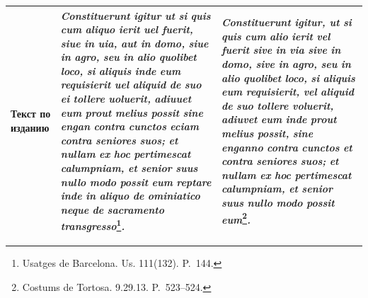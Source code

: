 \begin{center}
\begin{longtable}{|p{}|p{}|p{}|}
\textbf{Текст по изданию} & \emph{Constituerunt}\emph{ }\emph{igitur}\emph{ ut }\emph{si}\emph{ }\emph{quis}\emph{ }\emph{cum}\emph{ }\emph{aliquo}\emph{ }\emph{ierit}\emph{ }\emph{uel}\emph{ }\emph{fuerit}\emph{, }\emph{siue}\emph{ in }\emph{uia}\emph{, }\emph{aut}\emph{ in }\emph{domo}\emph{, }\emph{siue}\emph{ in }\emph{agro}\emph{, }\emph{seu}\emph{ in }\emph{alio}\emph{ }\emph{quolibet}\emph{ }\emph{loco}\emph{, }\emph{si}\emph{ }\emph{aliquis}\emph{ }\emph{inde}\emph{ }\emph{eum}\emph{ }\emph{requisierit}\emph{ }\emph{uel}\emph{ }\emph{aliquid}\emph{ de }\emph{suo}\emph{ }\emph{ei}\emph{ }\emph{tollere}\emph{ }\emph{uoluerit}\emph{, }\emph{adiuuet}\emph{ }\emph{eum}\emph{ }\emph{prout}\emph{ }\emph{melius}\emph{ }\emph{possit}\emph{ }\emph{sine}\emph{ }\emph{engan}\emph{ }\emph{contra}\emph{ }\emph{cunctos}\emph{ }\emph{eciam}\emph{ }\emph{contra}\emph{ }\emph{seniores}\emph{ }\emph{suos}\emph{; }\emph{et}\emph{ }\emph{nullam}\emph{ }\emph{ex}\emph{ }\emph{hoc}\emph{ }\emph{pertimescat}\emph{ }\emph{calumpniam}\emph{, }\emph{et}\emph{ }\emph{senior}\emph{ }\emph{suus}\emph{ }\emph{nullo}\emph{ }\emph{modo}\emph{ }\emph{possit}\emph{ }\emph{eum}\emph{ }\emph{reptare}\emph{ }\emph{inde}\emph{ in }\emph{aliquo}\emph{ de }\emph{ominiatico}\emph{ }\emph{neque}\emph{ de }\emph{sacramento}\emph{ }\emph{transgresso}\footnote{Usatges de Barcelona. Us. 111(132). P.~144.}\emph{.} & \emph{Constituerunt}\emph{ }\emph{igitur}\emph{, ut }\emph{si}\emph{ }\emph{quis}\emph{ }\emph{cum}\emph{ }\emph{alio}\emph{ }\emph{ierit}\emph{ }\emph{vel}\emph{ }\emph{fuerit}\emph{ }\emph{sive}\emph{ in }\emph{via}\emph{ }\emph{sive}\emph{ in }\emph{domo}\emph{, }\emph{sive}\emph{ in }\emph{agro}\emph{, }\emph{seu}\emph{ in }\emph{alio}\emph{ }\emph{quolibet}\emph{ }\emph{loco}\emph{, }\emph{si}\emph{ }\emph{aliquis}\emph{ }\emph{eum}\emph{ }\emph{requisierit}\emph{, }\emph{vel}\emph{ }\emph{aliquid}\emph{ de }\emph{suo}\emph{ }\emph{tollere}\emph{ }\emph{voluerit}\emph{, }\emph{adiuvet}\emph{ }\emph{eum}\emph{ }\emph{inde}\emph{ }\emph{prout}\emph{ }\emph{melius}\emph{ }\emph{possit}\emph{, }\emph{sine}\emph{ }\emph{enganno}\emph{ }\emph{contra}\emph{ }\emph{cunctos}\emph{ }\emph{et}\emph{ }\emph{contra}\emph{ }\emph{seniores}\emph{ }\emph{suos}\emph{; }\emph{et}\emph{ }\emph{nullam}\emph{ }\emph{ex}\emph{ }\emph{hoc}\emph{ }\emph{pertimescat}\emph{ }\emph{calumpniam}\emph{, }\emph{et}\emph{ }\emph{senior}\emph{ }\emph{suus}\emph{ }\emph{nullo}\emph{ }\emph{modo}\emph{ }\emph{possit}\emph{ }\emph{eum}\footnote{Costums de Tortosa. 9.29.13. P.~523--524.}\emph{.} \\ \hline

\end{longtable}
\end{center}
